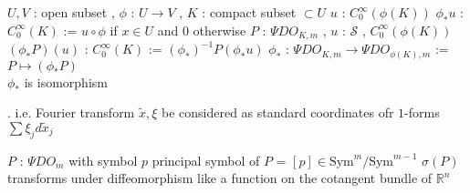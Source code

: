 \begin{Theorem}
\itemwhen
  \Fix \(U,V\) : open subset , \(\phi\) : \(U \to V\) , \(K\) : compact subset \(\subset U\)
\itemdefi
  \For \(u\) : \(C^\infty_0(\phi(K))\)
  \Define \(\phi_* u\) : \(C^\infty_0(K)\) := \(u \circ \phi\) if \(x \in U\) and \(0\) otherwise
\itemprop
  \For \(P\) : \(\Psi DO_{K,m}\) , \(u\) : \(\mathscr{S}\) , \(C^\infty_0(\phi(K))\) \\
  \Then \((\phi_* P)(u)\) : \(C^\infty_0(K)\) := \((\phi_*)^{-1} P(\phi_* u)\)
\itemprop
  \Define \(\phi_*\) : \(\Psi DO_{K,m} \to \Psi DO_{\phi(K) , m}\) := \(P \mapsto (\phi_* P)\) \\
  \Then \(\phi_*\) is isomorphism
\end{Theorem}

\begin{Proof}
\itemprof
\WIP
\end{Proof}

\begin{Theorem}
\itemprop
  \Then {}.  i.e. Fourier transform \(\tilde{x} , \xi\) be considered as standard coordinates ofr \(1\)-forms \(\sum \xi_j d \tilde{x}_j\) 
\end{Theorem}

\begin{Definition}
\itemdefi
  \For \(P\) : \(\Psi DO_m\) with symbol \(p\)
  \Define principal symbol of \(P\) = \([p] \in \text{Sym}^m / \text{Sym}^{m-1}\)
\itemprop
  \Then \(\sigma(P)\) transforms under diffeomorphism like a function on the cotangent bundle of \(\mathbb{R}^n\)
\end{Definition}